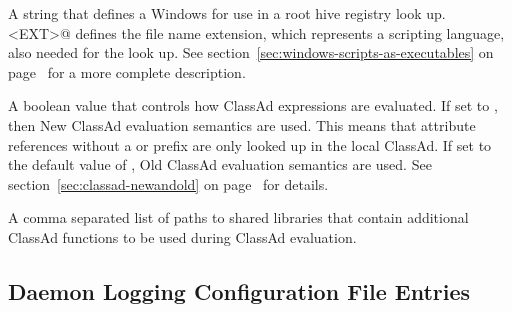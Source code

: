 \begin{description}
\label{param:OpenVerbForExtFiles}
\item[\Macro{OPEN\_VERB\_FOR\_<EXT>\_FILES}]
  A string that defines a Windows  for use in a root hive
  registry look up.
  \verb@<EXT>@ defines the file name extension, which represents a
  scripting language, also needed for the look up.
  See section~\ref{sec:windows-scripts-as-executables} on
  page~\pageref{sec:windows-scripts-as-executables} for a more complete
  description.

\label{param:StrictClassadEvaluation}
\item[\Macro{STRICT\_CLASSAD\_EVALUATION}]
  A boolean value that controls how ClassAd expressions are evaluated. 
  If set to , then New ClassAd evaluation semantics are used.
  This means that attribute references without a  or
   prefix are only looked up in the local ClassAd.
  If set to the default value of , 
  Old ClassAd evaluation semantics are used.
  See section~\ref{sec:classad-newandold}  on
  page~\pageref{sec:classad-newandold} for details.

\label{param:ClassadUserLibs}
\item[\Macro{CLASSAD\_USER\_LIBS}]
  A comma separated list of paths to shared libraries that contain
  additional ClassAd functions to be used during ClassAd evaluation.

\end{description}


\subsection{\label{sec:Daemon-Logging-Config-File-Entries}Daemon Logging Configuration File Entries} 

